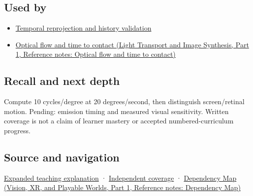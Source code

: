\subsection{Used by}\label{appendix-70895739febb-used-by}

\hypertarget{appendix-70895739febb-used-by}{}

\begin{itemize}
\tightlist
\item
  \hyperref[appendix-0727340a4428]{Temporal reprojection and history validation}
\item
  \href{../04-Light-Transport-and-Image-Synthesis-P01/main.pdf\#appendix-e2e73f8cd93e}{Optical flow and time to contact (Light Transport and Image Synthesis, Part 1, Reference notes: Optical flow and time to contact)}
\end{itemize}

\subsection{Recall and next depth}\label{appendix-70895739febb-recall-and-next-depth}

\hypertarget{appendix-70895739febb-recall-and-next-depth}{}

Compute 10 cycles/degree at 20 degrees/second, then distinguish screen/retinal motion. Pending: emission timing and measured visual sensitivity. Written coverage is not a claim of learner mastery or accepted numbered-curriculum progress.

\subsection{Source and navigation}\label{appendix-70895739febb-source-and-navigation}

\hypertarget{appendix-70895739febb-source-and-navigation}{}

\hyperref[04-visual-computing-ii-ch042-a-gaze-sample-needs-a-time-as-well-as-a-direction]{Expanded teaching explanation} · \hyperref[appendix-fd090d982a15-xr01---independent-seeing-and-representation-source]{Independent coverage} · \href{../07-Vision-XR-and-Playable-Worlds-P01/main.pdf\#appendix-4ad47bdd269a}{Dependency Map (Vision, XR, and Playable Worlds, Part 1, Reference notes: Dependency Map)}
